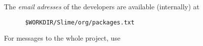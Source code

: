 The \emph{email adresses} of the developers are available (internally) at
\begin{verbatim}
      $WORKDIR/Slime/org/packages.txt
\end{verbatim}
For messages to the whole project, use
\fi


